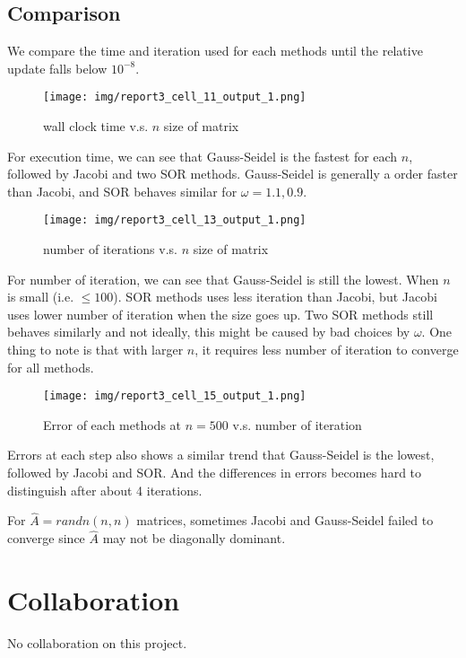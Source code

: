 \documentclass[a4paper,12pt]{article}
\begin{document}
\subsection{Comparison}

We compare the time and iteration used for each methods until the relative update falls below $10^{-8}$.
\begin{figure}[H]
    \centering
    \texttt{[image: img/report3\_cell\_11\_output\_1.png]}
    \caption{wall clock time v.s. $n$ size of matrix}
    \label{fig:0}   
\end{figure}

For execution time,
we can see that Gauss-Seidel is the fastest for each $n$,
followed by Jacobi and two SOR methods.
Gauss-Seidel is generally a order faster than Jacobi,
and SOR behaves similar for $\omega = 1.1, 0.9$.

\begin{figure}[H]
    \centering
    \texttt{[image: img/report3\_cell\_13\_output\_1.png]}
    \caption{number of iterations v.s. $n$ size of matrix}
    \label{fig:1}   
\end{figure}

For number of iteration,
we can see that Gauss-Seidel is still the lowest.
When $n$ is small (i.e. $\leq 100$). SOR methods uses less iteration than Jacobi,
but Jacobi uses lower number of iteration when the size goes up.
Two SOR methods still behaves similarly and not ideally,
this might be caused by bad choices by $\omega$.
One thing to note is that with larger $n$,
it requires less number of iteration to converge for all methods.

\begin{figure}[H]
    \centering
    \texttt{[image: img/report3\_cell\_15\_output\_1.png]}
    \caption{Error of each methods at $n = 500$ v.s. number of iteration}
    \label{fig:2}   
\end{figure}

Errors at each step also shows a similar trend that Gauss-Seidel is the lowest,
followed by Jacobi and SOR.
And the differences in errors becomes hard to distinguish after about 4 iterations.

For $\hat{A} = randn(n, n)$ matrices,
sometimes Jacobi and Gauss-Seidel failed to converge since $\hat{A}$ may not be diagonally dominant.


\section{Collaboration}
No collaboration on this project.
\end{document}
